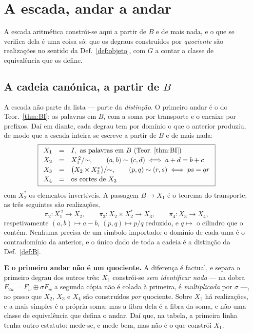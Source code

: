 \documentclass[11pt,a4paper]{article}
\begin{document}
\section{A escada, andar a andar}\label{sec:escada}

\noindent A escada aritmética constrói-se aqui a partir de $B$ e de mais nada, e
o que se verifica dela é uma coisa só: que os degraus construídos por
\emph{quociente} são realizações no sentido da Def.~\ref{def:objeto}, com $G$ a
contar a classe de equivalência que os define.

\subsection*{A cadeia canónica, a partir de $B$}

\noindent A escada não parte da lista --- parte da \emph{distinção}. O primeiro
andar é o do Teor.~\ref{thm:BI}: as palavras em $B$, com a soma por transporte e
o encaixe por prefixos. Daí em diante, cada degrau tem por domínio o que o
anterior produziu, de modo que a escada inteira se escreve a partir de $B$ e de
mais nada:
\[
\boxed{
\begin{array}{lll}
X_1 & = & I,\ \text{as palavras em } B \text{ (Teor.~\ref{thm:BI})}\\[2pt]
X_2 & = & X_1^{\,2}/{\sim}, \qquad (a,b)\sim(c,d)\iff a+d=b+c\\[2pt]
X_3 & = & \bigl(X_2\times X_2^{\ast}\bigr)/{\sim}, \qquad (p,q)\sim(r,s)\iff ps=qr\\[2pt]
X_4 & = & \text{os cortes de } X_3
\end{array}}
\]
com $X_2^{\ast}$ os elementos invertíveis. A passagem $B\to X_1$ é o teorema do
transporte; as três seguintes são realizações,
\[
\pi_2\colon X_1^{\,2}\to X_2,\qquad
\pi_3\colon X_2\times X_2^{\ast}\to X_3,\qquad
\pi_4\colon X_3\to X_4,
\]
respetivamente $(a,b)\mapsto a-b$, $(p,q)\mapsto p/q$ reduzido, e $q\mapsto$ o
cilindro que o contém. Nenhuma precisa de um símbolo importado: o domínio de
cada uma é o contradomínio da anterior, e o único dado de toda a cadeia é a
distinção da Def.~\ref{def:B}.

\medskip\noindent\textbf{E o primeiro andar não é um quociente.} A diferença é
factual, e separa o primeiro degrau dos outros três: $X_1$ constrói-se
\emph{sem identificar nada} --- na dobra $F_{2w}=F_w\oplus\sigma F_w$ a segunda
cópia não é colada à primeira, é \emph{multiplicada} por $\sigma$ ---, ao passo
que $X_2$, $X_3$ e $X_4$ são construídos \emph{por} quociente. Sobre $X_1$ há
realizações, e a mais simples é a própria soma; mas a fibra dela é a fibra da
soma, e não uma classe de equivalência que defina o andar. Daí que, na tabela, a
primeira linha tenha outro estatuto: mede-se, e mede bem, mas não é o que
constrói $X_1$.
\end{document}
